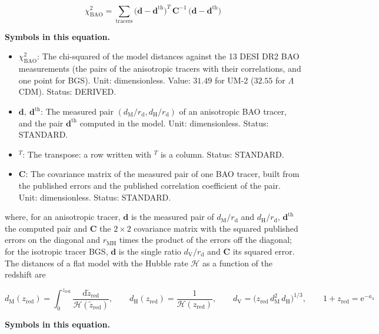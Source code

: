 \documentclass[
  10pt,
]{article}
\providecommand{\tightlist}{%
  \setlength{\itemsep}{0pt}\setlength{\parskip}{0pt}}
\begin{document}
\[
\chi_{\mathrm{BAO}}^2 = \sum_{\text{tracers}}\big(\mathbf{d} - \mathbf{d}^{\mathrm{th}}\big)^T\,\mathbf{C}^{-1}\,
 \big(\mathbf{d} - \mathbf{d}^{\mathrm{th}}\big)
\]

\textbf{Symbols in this equation.}

\begin{itemize}
\tightlist
\item
  \(\chi^2_{\mathrm{BAO}}\): The chi-squared of the model distances
  against the 13 DESI DR2 BAO measurements (the pairs of the anisotropic
  tracers with their correlations, and one point for BGS). Unit:
  dimensionless. Value: \(31.49\) for UM-2 (\(32.55\) for
  \(\Lambda\)CDM). Status: DERIVED.
\item
  \(\mathbf{d},\ \mathbf{d}^{\mathrm{th}}\): The measured pair
  \((d_{\mathrm{M}}/r_{\mathrm{d}}, d_{\mathrm{H}}/r_{\mathrm{d}})\) of
  an anisotropic BAO tracer, and the pair \(\mathbf{d}^{\mathrm{th}}\)
  computed in the model. Unit: dimensionless. Status: STANDARD.
\item
  \({}^T\): The transpose: a row written with \(^T\) is a column.
  Status: STANDARD.
\item
  \(\mathbf{C}\): The covariance matrix of the measured pair of one BAO
  tracer, built from the published errors and the published correlation
  coefficient of the pair. Unit: dimensionless. Status: STANDARD.
\end{itemize}

where, for an anisotropic tracer, \(\mathbf{d}\) is the measured pair of
\(d_{\mathrm{M}}/r_{\mathrm{d}}\) and \(d_{\mathrm{H}}/r_{\mathrm{d}}\),
\(\mathbf{d}^{\mathrm{th}}\) the computed pair and \(\mathbf{C}\) the
\(2\times2\) covariance matrix with the squared published errors on the
diagonal and \(r_{\mathrm{MH}}\) times the product of the errors off the
diagonal; for the isotropic tracer BGS, \(\mathbf{d}\) is the single
ratio \(d_{\mathrm{V}}/r_{\mathrm{d}}\) and \(\mathbf{C}\) its squared
error. The distances of a flat model with the Hubble rate
\(\mathcal{H}\) as a function of the redshift are

\[
d_{\mathrm{M}}(z_{\mathrm{red}}) = \int_0^{z_{\mathrm{red}}}\frac{\mathrm{d}\tilde z_{\mathrm{red}}}{\mathcal{H}(\tilde z_{\mathrm{red}})},
\qquad d_{\mathrm{H}}(z_{\mathrm{red}}) = \frac{1}{\mathcal{H}(z_{\mathrm{red}})},\qquad
d_{\mathrm{V}} = \big(z_{\mathrm{red}}\,d_{\mathrm{M}}^2\,d_{\mathrm{H}}\big)^{1/3},\qquad 1 + z_{\mathrm{red}} = \mathrm{e}^{-a_4}
\]

\textbf{Symbols in this equation.}
\end{document}
